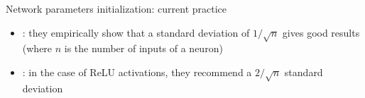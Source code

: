 \documentclass[xcolor=pdftex,dvipsnames,table,mathserif]{beamer}
\begin{document}
\begin{frame}{Network parameters initialization: current practice}

      \begin{itemize}
        \item \cite{glorot_understanding_2010}: they empirically show that a standard deviation of $1/\sqrt n$ gives good results (where $n$ is the number of inputs of a neuron)
          \item \cite{he_delving_2015}: in the case of ReLU activations, they recommend a $2/\sqrt  n$ standard deviation
        \end{itemize}

\end{frame}






\end{document}
